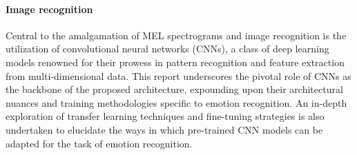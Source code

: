 \paragraph{Image recognition}
Central to the amalgamation of MEL spectrograms and image recognition is the utilization of convolutional neural networks (CNNs), a class of deep learning models renowned for their prowess in pattern recognition and feature extraction from multi-dimensional data. This report underscores the pivotal role of CNNs as the backbone of the proposed architecture, expounding upon their architectural nuances and training methodologies specific to emotion recognition. An in-depth exploration of transfer learning techniques and fine-tuning strategies is also undertaken to elucidate the ways in which pre-trained CNN models can be adapted for the task of emotion recognition.